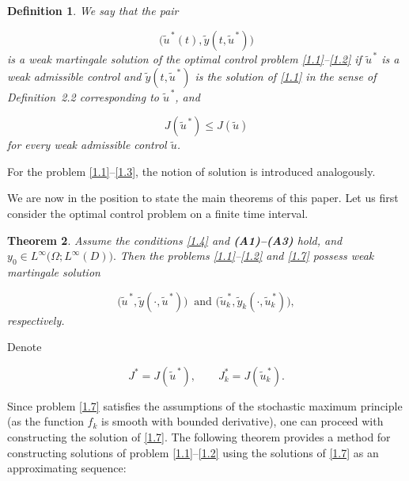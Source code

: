 \documentclass[a4paper,12pt]{article}
\newtheorem{definition}{Definition}[section]
\newtheorem{theorem}[definition]{Theorem}
\numberwithin{equation}{section}
\begin{document}
\begin{definition}\label{Def:2.3}
We say that the pair

\[
\bigl(
\widetilde u^{\,*}(t),
\widetilde y(t,\widetilde u^{\,*})
\bigr)
\]
is a weak martingale solution of the optimal control problem
\eqref{1.1}--\eqref{1.2} if
$\widetilde u^{\,*}$ is a weak admissible control and
$\widetilde y(t,\widetilde u^{\,*})$
is the solution of \eqref{1.1} in the sense of Definition~2.2
corresponding to $\widetilde u^{\,*}$, and

\begin{equation}
J(\widetilde u^{\,*})
\le
J(\widetilde u)
\label{2.9}
\end{equation}
for every weak admissible control $\widetilde u$.
\end{definition}
For the problem \eqref{1.1}--\eqref{1.3}, the notion of solution is
introduced analogously.

We are now in the position to state the main theorems of this paper. Let us first consider the optimal control problem on a finite time interval.

\begin{theorem}\label{Th:2.2}
Assume the conditions \eqref{1.4} and {{\bf \rm(A1)--(A3)}}
hold, and
$y_0\in L^\infty\!\bigl(\Omega;L^\infty(D)\bigr).
$
Then the problems \eqref{1.1}--\eqref{1.2} and \eqref{1.7}
possess weak martingale solution

\[
\bigl(\widetilde u^{\,*},
\widetilde y(\cdot,\widetilde u^{\,*})\bigr) \ \text{ and  } \bigl(\widetilde u_k^{\,*},
\widetilde y_k(\cdot,\widetilde u_k^{\,*})\bigr),
\]
respectively.
\end{theorem}

Denote

\[
J^{*}=J(\widetilde u^{\,*}),
\qquad
J_k^{*}=J(\widetilde u_k^{\,*}).
\]

Since problem \eqref{1.7} satisfies the assumptions of the stochastic
maximum principle (as the function $f_k$ is smooth with bounded derivative), one can proceed with constructing the solution of \eqref{1.7}. The following
theorem provides a method for constructing solutions of problem
\eqref{1.1}--\eqref{1.2} using the solutions of \eqref{1.7} as an approximating sequence:
\end{document}
